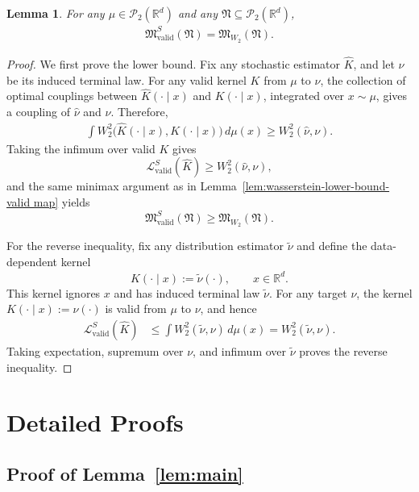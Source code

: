 \documentclass[11pt,twoside]{article}
\newcommand{\lvalids}{\mathcal{L}^S_{\text{valid}}}
\newtheorem{lemma}{Lemma}
\newcommand{\targetclass}{\mathfrak{N}}
\newcommand{\validsminimaxrisk}{\mathfrak{M}^S_{\text{valid}}}
\newcommand{\wtwominimaxrisk}{\mathfrak M_{W_2}}
\begin{document}
\begin{lemma}
\label{lem:kernel-risk-equals-w2-risk}
For any $\mu\in\mathcal P_2(\mathbb R^d)$ and any $\targetclass\subseteq\mathcal P_2(\mathbb R^d)$,
\begin{align}
\label{eq:kernel-risk-equals-w2-risk}
\validsminimaxrisk(\targetclass)
=
\wtwominimaxrisk(\targetclass).
\end{align}
\end{lemma}

\begin{proof}
We first prove the lower bound. Fix any stochastic estimator $\widehat K$, and let $\widehat\nu$ be its induced terminal law. For any valid kernel $K$ from $\mu$ to $\nu$, the collection of optimal couplings between $\widehat K(\cdot\mid x)$ and $K(\cdot\mid x)$, integrated over $x\sim\mu$, gives a coupling of $\widehat\nu$ and $\nu$. Therefore,
\begin{align*}
\int W_2^2\bigl(\widehat K(\cdot\mid x),K(\cdot\mid x)\bigr)\,d\mu(x)
\geq
W_2^2(\widehat\nu,\nu).
\end{align*}
Taking the infimum over valid $K$ gives
\[
\lvalids(\widehat K)
\geq
W_2^2(\widehat\nu,\nu),
\]
and the same minimax argument as in Lemma~\ref{lem:wasserstein-lower-bound-valid map} yields
\[
\validsminimaxrisk(\targetclass)
\geq
\wtwominimaxrisk(\targetclass).
\]

For the reverse inequality, fix any distribution estimator $\widetilde\nu$ and define the data-dependent kernel
\[
\widehat K(\cdot\mid x):=\widetilde\nu(\cdot),
\qquad x\in\mathbb R^d.
\]
This kernel ignores $x$ and has induced terminal law $\widetilde\nu$. For any target $\nu$, the kernel $K(\cdot\mid x):=\nu(\cdot)$ is valid from $\mu$ to $\nu$, and hence
\begin{align*}
\lvalids(\widehat K)
&\leq
\int W_2^2(\widetilde\nu,\nu)\,d\mu(x)
=
W_2^2(\widetilde\nu,\nu).
\end{align*}
Taking expectation, supremum over $\nu$, and infimum over $\widetilde\nu$ proves the reverse inequality.
\end{proof}


\section{Detailed Proofs}
\label{app:proofs}

\subsection{Proof of Lemma~\ref{lem:main}}
\end{document}
